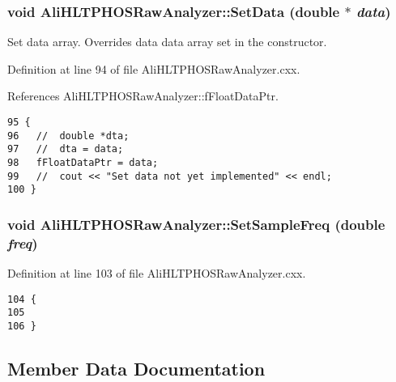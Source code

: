 \subsubsection{\setlength{\rightskip}{0pt plus 5cm}void Ali\-HLTPHOSRaw\-Analyzer::Set\-Data (double $\ast$ {\em data})\hspace{0.3cm}{\tt  [inherited]}}\label{classAliHLTPHOSRawAnalyzer_AliHLTPHOSRawAnalyzerPeakFindera12}


Set data array. Overrides data data array set in the constructor. 

Definition at line 94 of file Ali\-HLTPHOSRaw\-Analyzer.cxx.

References Ali\-HLTPHOSRaw\-Analyzer::f\-Float\-Data\-Ptr.

\footnotesize\begin{verbatim}95 {
96   //  double *dta;
97   //  dta = data;
98   fFloatDataPtr = data;
99   //  cout << "Set data not yet implemented" << endl;
100 }
\end{verbatim}\normalsize 


\subsubsection{\setlength{\rightskip}{0pt plus 5cm}void Ali\-HLTPHOSRaw\-Analyzer::Set\-Sample\-Freq (double {\em freq})\hspace{0.3cm}{\tt  [inherited]}}\label{classAliHLTPHOSRawAnalyzer_AliHLTPHOSRawAnalyzerPeakFindera13}




Definition at line 103 of file Ali\-HLTPHOSRaw\-Analyzer.cxx.

\footnotesize\begin{verbatim}104 {
105 
106 }
\end{verbatim}\normalsize 




\subsection{Member Data Documentation}
